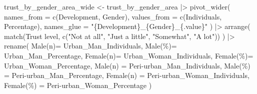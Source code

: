 \documentclass[
  letterpaper,
  DIV=11,
  numbers=noendperiod]{scrartcl}
\newenvironment{Shaded}{\begin{snugshade}}{\end{snugshade}}
\newcommand{\AttributeTok}[1]{\textcolor[rgb]{0.40,0.45,0.13}{#1}}
\newcommand{\FunctionTok}[1]{\textcolor[rgb]{0.28,0.35,0.67}{#1}}
\newcommand{\NormalTok}[1]{\textcolor[rgb]{0.00,0.23,0.31}{#1}}
\newcommand{\OtherTok}[1]{\textcolor[rgb]{0.00,0.23,0.31}{#1}}
\newcommand{\SpecialCharTok}[1]{\textcolor[rgb]{0.37,0.37,0.37}{#1}}
\newcommand{\StringTok}[1]{\textcolor[rgb]{0.13,0.47,0.30}{#1}}
\begin{document}
\begin{Shaded}
\begin{Highlighting}[]
\NormalTok{trust\_by\_gender\_area\_wide }\OtherTok{\textless{}{-}}\NormalTok{ trust\_by\_gender\_area }\SpecialCharTok{|\textgreater{}}
  \FunctionTok{pivot\_wider}\NormalTok{(}
    \AttributeTok{names\_from  =} \FunctionTok{c}\NormalTok{(Development, Gender),}
    \AttributeTok{values\_from =} \FunctionTok{c}\NormalTok{(Individuals, Percentage),}
    \AttributeTok{names\_glue  =} \StringTok{"\{Development\}\_\{Gender\}\_\{.value\}"}
\NormalTok{  ) }\SpecialCharTok{|\textgreater{}}
\FunctionTok{arrange}\NormalTok{(}
  \FunctionTok{match}\NormalTok{(}\StringTok{\textasciigrave{}}\AttributeTok{Trust level}\StringTok{\textasciigrave{}}\NormalTok{, }\FunctionTok{c}\NormalTok{(}\StringTok{"Not at all"}\NormalTok{, }\StringTok{"Just a little"}\NormalTok{, }\StringTok{"Somewhat"}\NormalTok{, }\StringTok{"A lot"}\NormalTok{))}
\NormalTok{) }\SpecialCharTok{|\textgreater{}}
  \FunctionTok{rename}\NormalTok{(}
    \StringTok{\textasciigrave{}}\AttributeTok{Male(n)}\StringTok{\textasciigrave{}}\OtherTok{=}\NormalTok{ Urban\_Man\_Individuals,}
    \StringTok{\textasciigrave{}}\AttributeTok{Male(\%)}\StringTok{\textasciigrave{}}\OtherTok{=}\NormalTok{ Urban\_Man\_Percentage,}
    \StringTok{\textasciigrave{}}\AttributeTok{Female(n)}\StringTok{\textasciigrave{}}\OtherTok{=}\NormalTok{ Urban\_Woman\_Individuals,}
    \StringTok{\textasciigrave{}}\AttributeTok{Female(\%)}\StringTok{\textasciigrave{}}\OtherTok{=}\NormalTok{ Urban\_Woman\_Percentage,}
    \StringTok{\textasciigrave{}}\AttributeTok{Male(n) }\StringTok{\textasciigrave{}}\OtherTok{=} \StringTok{\textasciigrave{}}\AttributeTok{Peri{-}urban\_Man\_Individuals}\StringTok{\textasciigrave{}}\NormalTok{,}
    \StringTok{\textasciigrave{}}\AttributeTok{Male(\%) }\StringTok{\textasciigrave{}}\OtherTok{=} \StringTok{\textasciigrave{}}\AttributeTok{Peri{-}urban\_Man\_Percentage}\StringTok{\textasciigrave{}}\NormalTok{,}
    \StringTok{\textasciigrave{}}\AttributeTok{Female(n) }\StringTok{\textasciigrave{}}\OtherTok{=} \StringTok{\textasciigrave{}}\AttributeTok{Peri{-}urban\_Woman\_Individuals}\StringTok{\textasciigrave{}}\NormalTok{,}
    \StringTok{\textasciigrave{}}\AttributeTok{Female(\%) }\StringTok{\textasciigrave{}}\OtherTok{=} \StringTok{\textasciigrave{}}\AttributeTok{Peri{-}urban\_Woman\_Percentage}\StringTok{\textasciigrave{}}
\NormalTok{  )}


\end{Highlighting}
\end{Shaded}
\end{document}
